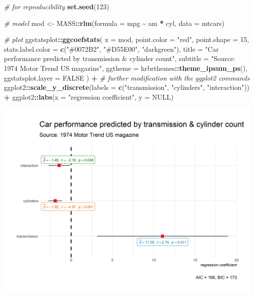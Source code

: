 \documentclass[
]{article}
\newenvironment{Shaded}{\begin{snugshade}}{\end{snugshade}}
\newcommand{\CommentTok}[1]{\textcolor[rgb]{0.56,0.35,0.01}{\textit{#1}}}
\newcommand{\DataTypeTok}[1]{\textcolor[rgb]{0.13,0.29,0.53}{#1}}
\newcommand{\DecValTok}[1]{\textcolor[rgb]{0.00,0.00,0.81}{#1}}
\newcommand{\KeywordTok}[1]{\textcolor[rgb]{0.13,0.29,0.53}{\textbf{#1}}}
\newcommand{\NormalTok}[1]{#1}
\newcommand{\OperatorTok}[1]{\textcolor[rgb]{0.81,0.36,0.00}{\textbf{#1}}}
\newcommand{\OtherTok}[1]{\textcolor[rgb]{0.56,0.35,0.01}{#1}}
\newcommand{\StringTok}[1]{\textcolor[rgb]{0.31,0.60,0.02}{#1}}
\begin{document}
\begin{Shaded}
\begin{Highlighting}[]
\CommentTok{\# for reproducibility}
\KeywordTok{set.seed}\NormalTok{(}\DecValTok{123}\NormalTok{)}

\CommentTok{\# model}
\NormalTok{mod <{-}}\StringTok{ }\NormalTok{MASS}\OperatorTok{::}\KeywordTok{rlm}\NormalTok{(}\DataTypeTok{formula =}\NormalTok{ mpg }\OperatorTok{\textasciitilde{}}\StringTok{ }\NormalTok{am }\OperatorTok{*}\StringTok{ }\NormalTok{cyl, }\DataTypeTok{data =}\NormalTok{ mtcars)}

\CommentTok{\# plot}
\NormalTok{ggstatsplot}\OperatorTok{::}\KeywordTok{ggcoefstats}\NormalTok{(}
  \DataTypeTok{x =}\NormalTok{ mod,}
  \DataTypeTok{point.color =} \StringTok{"red"}\NormalTok{,}
  \DataTypeTok{point.shape =} \DecValTok{15}\NormalTok{,}
  \DataTypeTok{stats.label.color =} \KeywordTok{c}\NormalTok{(}\StringTok{"\#0072B2"}\NormalTok{, }\StringTok{"\#D55E00"}\NormalTok{, }\StringTok{"darkgreen"}\NormalTok{),}
  \DataTypeTok{title =} \StringTok{"Car performance predicted by transmission \& cylinder count"}\NormalTok{,}
  \DataTypeTok{subtitle =} \StringTok{"Source: 1974 Motor Trend US magazine"}\NormalTok{,}
  \DataTypeTok{ggtheme =}\NormalTok{ hrbrthemes}\OperatorTok{::}\KeywordTok{theme\_ipsum\_ps}\NormalTok{(),}
  \DataTypeTok{ggstatsplot.layer =} \OtherTok{FALSE}
\NormalTok{) }\OperatorTok{+}\StringTok{ }\CommentTok{\# further modification with the ggplot2 commands}
\StringTok{  }\NormalTok{ggplot2}\OperatorTok{::}\KeywordTok{scale\_y\_discrete}\NormalTok{(}\DataTypeTok{labels =} \KeywordTok{c}\NormalTok{(}\StringTok{"transmission"}\NormalTok{, }\StringTok{"cylinders"}\NormalTok{, }\StringTok{"interaction"}\NormalTok{)) }\OperatorTok{+}
\StringTok{  }\NormalTok{ggplot2}\OperatorTok{::}\KeywordTok{labs}\NormalTok{(}\DataTypeTok{x =} \StringTok{"regression coefficient"}\NormalTok{, }\DataTypeTok{y =} \OtherTok{NULL}\NormalTok{)}
\end{Highlighting}
\end{Shaded}

\includegraphics[width=1\linewidth]{./figures/paper-ggcoefstats2-1}
\end{document}
